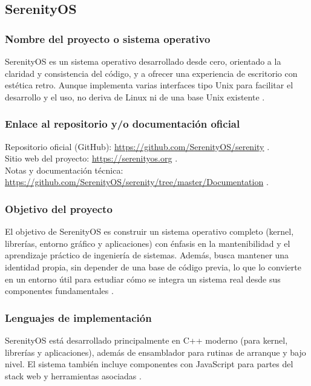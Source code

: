\subsection{SerenityOS}

\subsubsection{Nombre del proyecto o sistema operativo}
SerenityOS es un sistema operativo desarrollado desde cero, orientado a la claridad y consistencia del código, y a ofrecer una experiencia de escritorio con estética retro. Aunque implementa varias interfaces tipo Unix para facilitar el desarrollo y el uso, no deriva de Linux ni de una base Unix existente \cite{serenity_about, serenity_wiki}.

\subsubsection{Enlace al repositorio y/o documentación oficial}
Repositorio oficial (GitHub): \url{https://github.com/SerenityOS/serenity} \cite{serenityos:github}.\\
Sitio web del proyecto: \url{https://serenityos.org} \cite{serenity_about}.\\
Notas y documentación técnica: \url{https://github.com/SerenityOS/serenity/tree/master/Documentation} \cite{serenity_arch}.

\subsubsection{Objetivo del proyecto}
El objetivo de SerenityOS es construir un sistema operativo completo (kernel, librerías, entorno gráfico y aplicaciones) con énfasis en la mantenibilidad y el aprendizaje práctico de ingeniería de sistemas. Además, busca mantener una identidad propia, sin depender de una base de código previa, lo que lo convierte en un entorno útil para estudiar cómo se integra un sistema real desde sus componentes fundamentales \cite{serenity_about, serenity_arch}.

\subsubsection{Lenguajes de implementación}
SerenityOS está desarrollado principalmente en C++ moderno (para kernel, librerías y aplicaciones), además de ensamblador para rutinas de arranque y bajo nivel. El sistema también incluye componentes con JavaScript para partes del stack web y herramientas asociadas \cite{serenity_arch, serenityos:github}.


